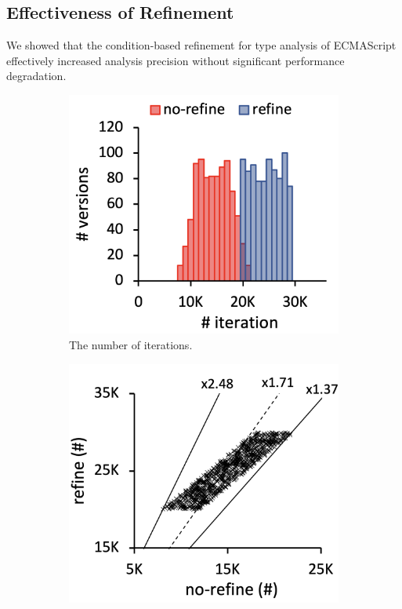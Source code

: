 \subsection{Effectiveness of Refinement}\label{sec:effect-refine}

We showed that the condition-based refinement for type analysis of ECMAScript
effectively increased analysis precision without significant performance
degradation. \todo

\begin{figure}
  \centering
  \begin{subfigure}[b]{0.24\textwidth}
    \includegraphics[width=\textwidth]{img/compare-iter}
    \caption{The number of iterations.}
  \end{subfigure}
  \begin{subfigure}[b]{0.24\textwidth}
    \includegraphics[width=\textwidth]{img/ratio-iter}

\end{subfigure}
\end{figure}

